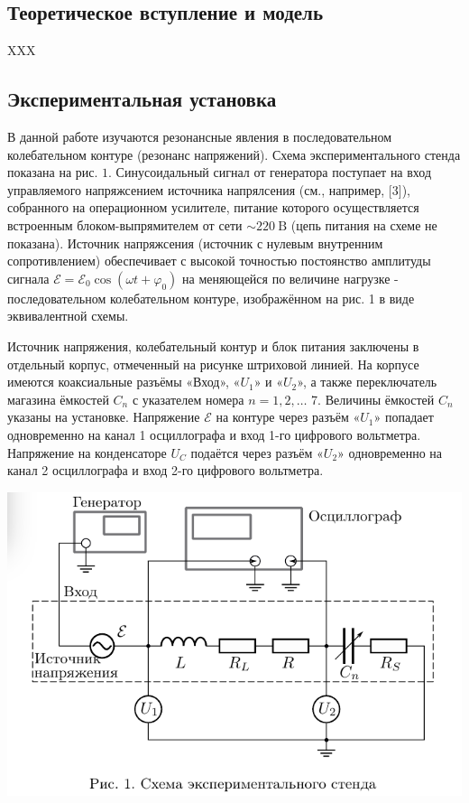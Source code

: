 \documentclass[a4paper, 12pt]{article}%
\begin{document}
\subsection{Теоретическое вступление и модель}

XXX

\subsection{Экспериментальная установка}

В данной работе изучаются резонансные явления в последовательном колебательном контуре (резонанс напряжений). Схема экспериментального стенда показана на рис. $1 .$ Синусоидальный сигнал от генератора поступает на вход управляемого напряжсением источника напрялсения (см., например, [3]), собранного на операционном усилителе, питание которого осуществляется встроенным блоком-выпрямителем от сети $\sim 220 \mathrm{~B}$ (цепь питания на схеме не показана). Источник напряжсения (источник с нулевым внутренним сопротивлением) обеспечивает с высокой точностью постоянство амплитуды сигнала $\mathcal{E}=\mathcal{E}_{0} \cos \left(\omega t+\varphi_{0}\right)$ на меняющейся по величине нагрузке - последовательном колебательном контуре, изображённом на рис. 1 в виде эквивалентной схемы.

Источник напряжения, колебательный контур и блок питания заключены в отдельный корпус, отмеченный на рисунке штриховой линией. На корпусе имеются коаксиальные разъёмы «Вход», «$U_1$» и «$U_{2}$», а также переключатель магазина ёмкостей $C_{n}$ с указателем номера $n=1,2, \ldots$ 7. Величины ёмкостей $C_{n}$ указаны на установке. Напряжение $\mathcal{E}$ на контуре через разъём «$U_1$» попадает одновременно на канал 1 осциллографа и вход 1-го цифрового вольтметра. Напряжение на конденсаторе $U_{C}$ подаётся через разъём «$U_2$» одновременно на канал 2 осциллографа и вход 2-го цифрового вольтметра.

\begin{center}

    \includegraphics[scale=0.65]{pics/scheme1.png} \\

\end{center}
\end{document}
